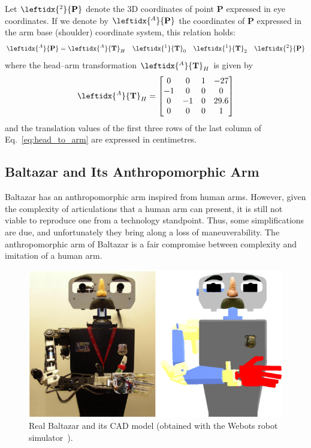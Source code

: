 Let $\leftidx{^2}{\mathbf{P}}$ denote the 3D coordinates of point $\mathbf{P}$ expressed in eye coordinates. If we denote by $\leftidx{^A}{\mathbf{P}}$ the coordinates of $\mathbf{P}$ expressed in the arm base (shoulder) coordinate system, this relation holds:
%
\begin{equation}
\leftidx{^A}{\mathbf{P}} = \leftidx{^A}{\mathbf{T}}_H \quad \leftidx{^1}{\mathbf{T}}_0 \quad \leftidx{^1}{\mathbf{T}}_2 \quad \leftidx{^2}{\mathbf{P}}
\end{equation}
%
where the head--arm transformation $\leftidx{^A}{\mathbf{T}}_H$ is given by
%
\begin{equation}\label{eq:head_to_arm}
\leftidx{^A}{\mathbf{T}}_H =	\begin{bmatrix}
						0 & 0 & 1 & -27 \\
						-1 & 0 & 0 & 0 \\
						0 & -1 & 0 & 29.6 \\
						0 & 0 & 0 & 1
						\end{bmatrix}
\end{equation}
and the translation values of the first three rows of the last column of Eq.~\ref{eq:head_to_arm} are expressed in centimetres.

\subsection{Baltazar and Its Anthropomorphic Arm}

Baltazar has an anthropomorphic arm inspired from human arms. However, given the complexity of articulations that a human arm can present, it is still not viable to reproduce one from a technology standpoint. Thus, some simplifications are due, and unfortunately they bring along a loss of maneuverability. The anthropomorphic arm of Baltazar is a fair compromise between complexity and imitation of a human arm.

\begin{figure}
\centering
\includegraphics[scale=0.5]{figures/balta_real_cad}
\caption[Real Baltazar and its CAD model]{Real Baltazar and its CAD model (obtained with the Webots robot simulator~\cite{link:webots}).}
\label{img:balta_real_cad}
\end{figure}

